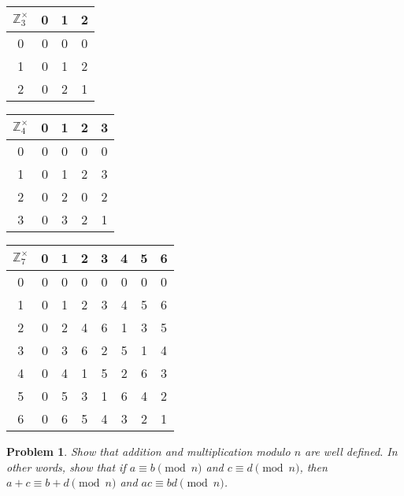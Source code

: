 \documentclass[12pt]{article}
\newenvironment{answer}
    {\begin{adjustwidth}{0pt}{0pt}}
    {\end{adjustwidth}}
\newtheorem{problem}{Problem}
\theoremstyle{remark}  %
\begin{document}
\begin{answer}
        \begin{center}
            \begin{tabular}{c|ccc}
                $\mathbb{Z}_3^{\times}$ & 0 & 1 & 2  \\
                \hline
                0 & 0 & 0 & 0 \\
                1 & 0 & 1 & 2 \\
                2 & 0 & 2 & 1
            \end{tabular}
            \hspace{5pt}
            \begin{tabular}{c|cccc}
                $\mathbb{Z}_4^{\times}$ & 0 & 1 & 2 & 3 \\
                \hline
                0 & 0 & 0 & 0 & 0 \\
                1 & 0 & 1 & 2 & 3 \\
                2 & 0 & 2 & 0 & 2 \\ 
                3 & 0 & 3 & 2 & 1
            \end{tabular}
            \hspace{5pt}
            \begin{tabular}{c|ccccccc}
                $\mathbb{Z}_7^{\times}$ & 0 & 1 & 2 & 3 & 4 & 5 & 6 \\
                \hline
                0 & 0 & 0 & 0 & 0 & 0 & 0 & 0 \\
                1 & 0 & 1 & 2 & 3 & 4 & 5 & 6 \\
                2 & 0 & 2 & 4 & 6 & 1 & 3 & 5 \\ 
                3 & 0 & 3 & 6 & 2 & 5 & 1 & 4 \\
                4 & 0 & 4 & 1 & 5 & 2 & 6 & 3 \\
                5 & 0 & 5 & 3 & 1 & 6 & 4 & 2 \\
                6 & 0 & 6 & 5 & 4 & 3 & 2 & 1 
            \end{tabular}
        \end{center}
    \end{answer}
\vspace{5pt}
    \setcounter{problem}{3}
    \begin{problem}
        Show that addition and multiplication modulo $n$ are well defined. In other words, show that if $a\equiv b\pmod{n}$ and $c\equiv d \pmod{n}$, then $a+c\equiv b+d\pmod{n}$ and $ac\equiv bd\pmod{n}$.
    \end{problem}
\end{document}
